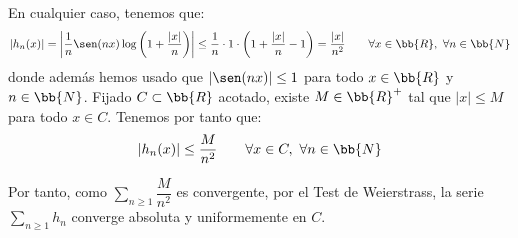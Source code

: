 \begin{ejercicio}
    En cualquier caso, tenemos que:
    \begin{equation*}
        \left|h_n(x)\right|
        = \left|\frac{1}{n}\sen(nx)\log\left(1+\frac{|x|}{n}\right)\right|
        \leq \frac{1}{n}\cdot 1\cdot \left(1+\frac{|x|}{n}-1\right) = \frac{|x|}{n^2} \qquad \forall x\in \bb{R},~\forall n\in \bb{N}
    \end{equation*}
    donde además hemos usado que $|\sen(nx)|\leq 1$ para todo $x\in \bb{R}$ y $n\in \bb{N}$. Fijado $C\subset \bb{R}$ acotado, existe $M\in \bb{R}^+$ tal que $|x|\leq M$ para todo $x\in C$. Tenemos por tanto que:
    \begin{equation*}
        \left|h_n(x)\right| \leq \frac{M}{n^2} \qquad \forall x\in C,~\forall n\in \bb{N}
    \end{equation*}

    Por tanto, como $\sum\limits_{n\geq 1}\dfrac{M}{n^2}$ es convergente, por el Test de Weierstrass, la serie $\sum\limits_{n\geq 1}h_n$ converge absoluta y uniformemente en $C$.
\end{ejercicio}


